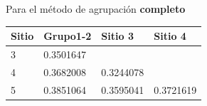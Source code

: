 \documentclass[]{book}
\begin{document}
Para el método de agrupación \textbf{completo}

\begin{longtable}[]{@{}llll@{}}
\toprule
\begin{minipage}[b]{0.09\columnwidth}\raggedright\strut
Sitio\strut
\end{minipage} & \begin{minipage}[b]{0.15\columnwidth}\raggedright\strut
Grupo1-2\strut
\end{minipage} & \begin{minipage}[b]{0.14\columnwidth}\raggedright\strut
Sitio 3\strut
\end{minipage} & \begin{minipage}[b]{0.15\columnwidth}\raggedright\strut
Sitio 4\strut
\end{minipage}\tabularnewline
\midrule
\endhead
\begin{minipage}[t]{0.09\columnwidth}\raggedright\strut
3\strut
\end{minipage} & \begin{minipage}[t]{0.15\columnwidth}\raggedright\strut
0.3501647\strut
\end{minipage} & \begin{minipage}[t]{0.14\columnwidth}\raggedright\strut
\strut
\end{minipage} & \begin{minipage}[t]{0.15\columnwidth}\raggedright\strut
\strut
\end{minipage}\tabularnewline
\begin{minipage}[t]{0.09\columnwidth}\raggedright\strut
4\strut
\end{minipage} & \begin{minipage}[t]{0.15\columnwidth}\raggedright\strut
0.3682008\strut
\end{minipage} & \begin{minipage}[t]{0.14\columnwidth}\raggedright\strut
0.3244078\strut
\end{minipage} & \begin{minipage}[t]{0.15\columnwidth}\raggedright\strut
\strut
\end{minipage}\tabularnewline
\begin{minipage}[t]{0.09\columnwidth}\raggedright\strut
5\strut
\end{minipage} & \begin{minipage}[t]{0.15\columnwidth}\raggedright\strut
0.3851064\strut
\end{minipage} & \begin{minipage}[t]{0.14\columnwidth}\raggedright\strut
0.3595041\strut
\end{minipage} & \begin{minipage}[t]{0.15\columnwidth}\raggedright\strut
0.3721619\strut
\end{minipage}\tabularnewline
\bottomrule
\end{longtable}
\end{document}
